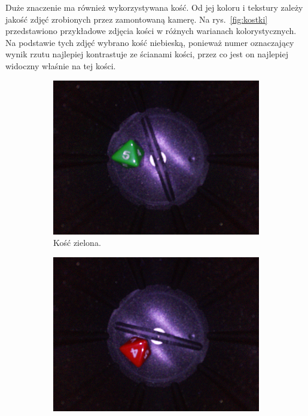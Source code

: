 Duże znaczenie ma również wykorzystywana kość. Od jej koloru i tekstury zależy jakość zdjęć zrobionych przez
zamontowaną kamerę. Na rys.~\ref{fig:kostki} przedstawiono przykładowe zdjęcia kości w różnych warianach kolorystycznych.
Na podstawie tych zdjęć wybrano kość niebieską, ponieważ numer oznaczający wynik rzutu najlepiej kontrastuje ze ścianami kości, przez co jest on najlepiej widoczny
właśnie na tej kości.

\begin{figure}[H]
    \centering
    \begin{subfigure}{0.32\textwidth}
        \centering
        \includegraphics[width=\linewidth]{chapters/03-praca-wlasna/figures/kolorki/zielona.jpg}
        \caption{\label{fig:zielona}Kość zielona.}
    \end{subfigure}
    \hfill
    \begin{subfigure}{0.32\textwidth}
        \centering
        \includegraphics[width=\linewidth]{chapters/03-praca-wlasna/figures/kolorki/czerwona.jpg}

\end{subfigure}
\end{figure}
